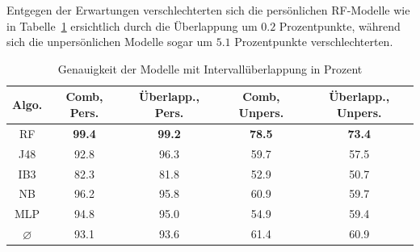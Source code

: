 Entgegen der Erwartungen verschlechterten sich die persönlichen \acs{RF}-Modelle wie in Tabelle~\ref{tab:accuracy-overlap} ersichtlich durch die Überlappung um $0.2$ Prozentpunkte, während sich die unpersönlichen Modelle sogar um $5.1$ Prozentpunkte verschlechterten.

\begin{table}
\centering
\begin{tabular}{|c|c|c||c|c|}
	\hline 
	\textbf{Algo.} & \textbf{Comb, Pers.} & \textbf{Überlapp., Pers.} &\textbf{Comb, Unpers.} & \textbf{Überlapp., Unpers.} \\ 
	\hline 
	\acs{RF} & \textbf{99.4} & \textbf{99.2} & \textbf{78.5} & \textbf{73.4} \\ 
	\acs{J48} & 92.8 & 96.3 & 59.7 & 57.5 \\ 
	\acs{IB}3 & 82.3 & 81.8 & 52.9 & 50.7 \\ 
	\acs{NB} & 96.2 & 95.8 & 60.9 & 59.7 \\ 
	\acs{MLP} & 94.8 & 95.0 & 54.9 & 59.4 \\ 
	\hline 
	$\varnothing$ & 93.1 & 93.6 & 61.4 & 60.9 \\ 
	\hline
\end{tabular} 
\caption{Genauigkeit der Modelle mit Intervallüberlappung in Prozent}
\label{tab:accuracy-overlap}
\end{table}


